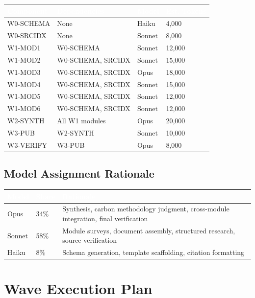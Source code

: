 \documentclass[11pt,letterpaper]{article}
\newcommand{\tableheader}[1]{\textbf{\sffamily\textcolor{white}{#1}}}
\begin{document}
\begin{center}
\begin{tabularx}{\textwidth}{L{3cm}L{2.5cm}C{1.5cm}C{2cm}}
\toprule
{}
\tableheader{Component} & \tableheader{Dependencies} & \tableheader{Model} & \tableheader{Est. Tokens} \\
\midrule
W0-SCHEMA & None & Haiku & 4,000 \\
W0-SRCIDX & None & Sonnet & 8,000 \\
W1-MOD1 & W0-SCHEMA & Sonnet & 12,000 \\
W1-MOD2 & W0-SCHEMA, SRCIDX & Sonnet & 15,000 \\
W1-MOD3 & W0-SCHEMA, SRCIDX & Opus & 18,000 \\
W1-MOD4 & W0-SCHEMA, SRCIDX & Sonnet & 15,000 \\
W1-MOD5 & W0-SCHEMA, SRCIDX & Sonnet & 12,000 \\
W1-MOD6 & W0-SCHEMA, SRCIDX & Sonnet & 12,000 \\
W2-SYNTH & All W1 modules & Opus & 20,000 \\
W3-PUB & W2-SYNTH & Sonnet & 10,000 \\
W3-VERIFY & W3-PUB & Opus & 8,000 \\
\bottomrule
\end{tabularx}
\end{center}

\subsection{Model Assignment Rationale}

\begin{center}
\begin{tabularx}{\textwidth}{C{1.5cm}C{1.5cm}X}
\toprule
{}
\tableheader{Model} & \tableheader{Share} & \tableheader{Rationale} \\
\midrule
Opus & 34\% & Synthesis, carbon methodology judgment, cross-module integration, final verification \\
Sonnet & 58\% & Module surveys, document assembly, structured research, source verification \\
Haiku & 8\% & Schema generation, template scaffolding, citation formatting \\
\bottomrule
\end{tabularx}
\end{center}

\section{Wave Execution Plan}
\end{document}
